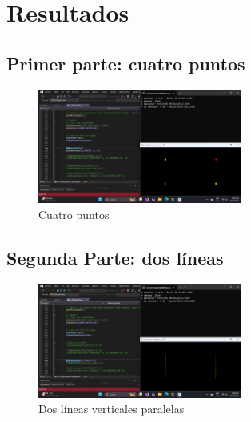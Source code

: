 \documentclass[a4paper,11pt]{article}                 %
\begin{document}
\section{Resultados}
\subsection{Primer parte: cuatro puntos}
\begin{figure}[H] %
    \centering %
    \includegraphics[width=0.6\textwidth]{images/dots.png} %
    \caption{Cuatro puntos} %
    \label{fig:dots} %
\end{figure}
\subsection{Segunda Parte: dos líneas}
\begin{figure}[H] %
    \centering %
    \includegraphics[width=0.6\textwidth]{images/lines.png} %
    \caption{Dos líneas verticales paralelas} %
    \label{fig:line} %
\end{figure}
\end{document}
